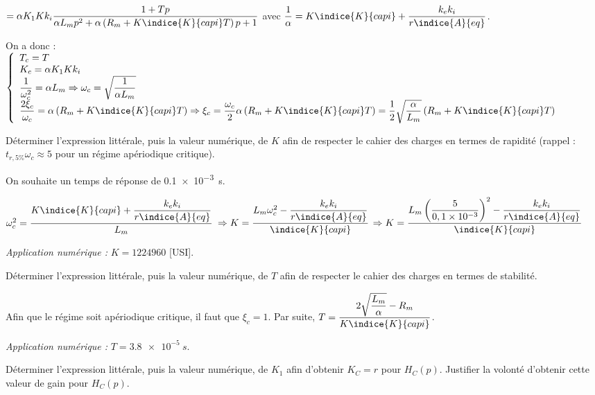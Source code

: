 \documentclass[11pt]{article}
\begin{document}
\begin{UPSTIcorrige}
$=\alpha K_1 Kk_i \dfrac{1+Tp }{\alpha L_mp^2 + \alpha\left(R_m+  K\indice{K}{capi}T\right) p+1} $ avec $\dfrac{1}{\alpha} = K\indice{K}{capi}+\dfrac{k_e k_i}{r\indice{A}{eq}}$.

On a donc : 
$
\left\{
\begin{array}{l}
T_c = T \\
K_c = \alpha K_1 Kk_i  \\
\dfrac{1}{\omega_c^2} = \alpha L_m \Rightarrow  \omega_c = \sqrt{\dfrac{1}{\alpha L_m}} \\
\dfrac{2 \xi_c}{\omega_c} = \alpha\left(R_m+  K\indice{K}{capi}T\right) 
\Rightarrow  \xi_c = \dfrac{\omega_c}{2}\alpha\left(R_m+  K\indice{K}{capi}T\right) = \dfrac{1}{2}\sqrt{\dfrac{\alpha}{ L_m}} \left(R_m+  K\indice{K}{capi}T\right)  \\
\end{array}
\right.
$
\end{UPSTIcorrige}

\UPSTIquestion Déterminer l'expression littérale, puis la valeur numérique, de $K$ afin de respecter le cahier des charges en termes de rapidité (rappel : $t_{r, 5 \%} \omega_{c} \approx 5$ pour un régime apériodique critique).

\begin{UPSTIcorrige}
On souhaite un temps de réponse de \SI{0,1e-3}{s}. 

$\omega_c^2  = \dfrac{K\indice{K}{capi}+\dfrac{k_e k_i}{r\indice{A}{eq}}}{L_m} $
$\Rightarrow K = \dfrac{L_m\omega_c^2 - \dfrac{k_e k_i}{r\indice{A}{eq}}}{\indice{K}{capi}}$
$\Rightarrow K = \dfrac{L_m\left(\dfrac{5}{0,1 \times 10^{-3}} \right)^2 - \dfrac{k_e k_i}{r\indice{A}{eq}}}{\indice{K}{capi}}$

\textit{Application numérique : } $K=1224960$ [USI].
\end{UPSTIcorrige}

\UPSTIquestion Déterminer l'expression littérale, puis la valeur numérique, de $T$ afin de respecter le cahier des charges en termes de stabilité.

\begin{UPSTIcorrige}
Afin que le régime soit apériodique critique, il faut que $\xi_c = 1$. 
Par suite, $    T = \dfrac{2\sqrt{\dfrac{ L_m}{\alpha}} - R_m }{K\indice{K}{capi}} $.

\textit{Application numérique : } $T=\SI{3,8e-5}{s}$.
\end{UPSTIcorrige}

\UPSTIquestion  Déterminer l'expression littérale, puis la valeur numérique, de $K_{1}$ afin d'obtenir $K_{C}=r$ pour $H_{C}(p)$. Justifier la volonté d'obtenir cette valeur de gain pour $H_{C}(p)$.
\begin{UPSTIcorrige}

\end{UPSTIcorrige}
\end{document}
